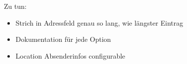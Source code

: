 \documentclass[twoside]{brbrief}
\begin{document}
	\maketitle{}
	
	\lipsum[1-2]
	
	Zu tun:
	\begin{itemize}
		\item Strich in Adressfeld genau so lang, wie längster Eintrag
		\item Dokumentation für jede Option
		\item Location Absenderinfos configurable
	\end{itemize}
	
	
	
	
	
\end{document}
